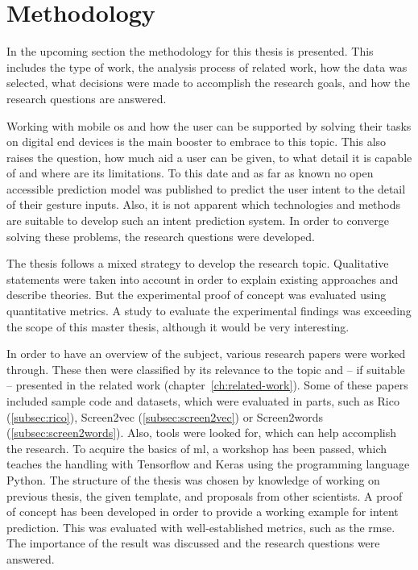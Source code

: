 \chapter{Methodology}

In the upcoming section the methodology for this thesis is presented.
This includes the type of work,
the analysis process of related work,
how the data was selected,
what decisions were made to accomplish the research goals,
and how the research questions are answered.


Working with mobile \gls{os} and how the user can be supported by solving their tasks on digital end devices is the main booster to embrace to this topic.
This also raises the question, how much aid a user can be given, to what detail it is capable of and where are its limitations.
To this date and as far as known no open accessible prediction model was published to predict the user intent to the detail of their gesture inputs.
Also, it is not apparent which technologies and methods are suitable to develop such an intent prediction system.
In order to converge solving these problems, the research questions were developed.


The thesis follows a mixed strategy to develop the research topic.
Qualitative statements were taken into account in order to explain existing approaches and describe theories.
But the experimental proof of concept was evaluated using quantitative metrics.
A study to evaluate the experimental findings was exceeding the scope of this master thesis, although it would be very interesting.


In order to have an overview of the subject, various research papers were worked through.
These then were classified by its relevance to the topic and -- if suitable -- presented in the related work (chapter~\ref{ch:related-work}).
Some of these papers included sample code and datasets, which were evaluated in parts, such as Rico (\ref{subsec:rico}), Screen2vec (\ref{subsec:screen2vec}) or Screen2words (\ref{subsec:screen2words}).
Also, tools were looked for, which can help accomplish the research.
To acquire the basics of \gls{ml}, a workshop has been passed, which teaches the handling with Tensorflow and Keras using the programming language Python.
The structure of the thesis was chosen by knowledge of working on previous thesis, the given template, and proposals from other scientists.
A proof of concept has been developed in order to provide a working example for intent prediction.
This was evaluated with well-established metrics, such as the \gls{rmse}.
The importance of the result was discussed and the research questions were answered.


